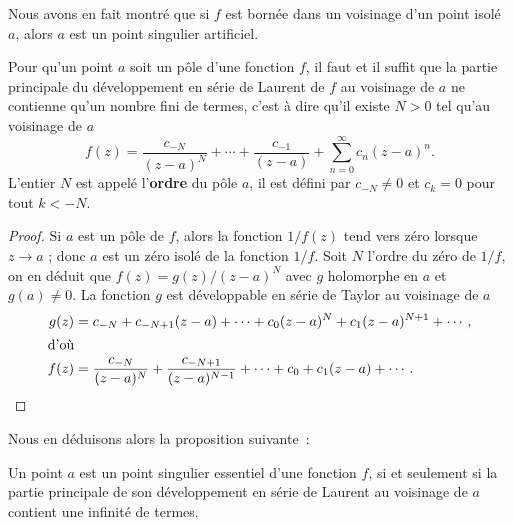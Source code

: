 \begin{rem} Nous avons en fait montré que si $f$ est bornée dans un voisinage d'un point isolé $a$, alors $a$ est un point singulier artificiel. 
\end{rem}

\begin{fprop} Pour qu'un point $a$ soit un pôle d'une fonction $f$, il faut et il suffit que la partie principale du développement en série de Laurent de $f$ au voisinage de $a$ ne contienne qu'un nombre fini de termes, c'est à dire qu'il existe $N>0$ tel qu'au voisinage de $a$
\[ f(z)=\frac{c_{-N}}{(z-a)^N} + \cdots + \frac{c_{-1}}{(z-a)} + \sum_{n=0}^\infty c_n(z-a)^n.\]
L'entier $N$ est appelé l'\textbf{ordre} du pôle $a$, il est défini par $c_{-N} \neq 0$ et $c_{k} = 0$ pour tout $k <-N$.  
\end{fprop}

\begin{proof}
Si $a$ est un pôle de $f$, alors la fonction $1/f(z)$ tend vers zéro lorsque $z \to a$ ; donc $a$ est un zéro isolé de la fonction $1/f$. Soit $N$ l'ordre du zéro de $1/f$, on en déduit que $f(z)=g(z)/(z-a)^N$ avec $g$ holomorphe en $a$ et $g(a) \neq 0$. La fonction $g$ est développable en série de Taylor au voisinage de $a$
\begin{align*}
g(z)&=c_{-N} + c_{-N+1} (z-a)  + \cdots + c_0(z-a)^N + c_1(z-a)^{N+1} + \cdots,\\
\intertext{d'où}
f(z)&= \frac{c_{-N}}{(z-a)^N} + \frac{c_{-N+1}}{(z-a)^{N-1}} + \cdots + c_0 + c_1 (z-a) + \cdots.
\end{align*}
\end{proof}

Nous en déduisons alors la proposition suivante~:
\begin{prop}
Un point $a$ est un point singulier essentiel d'une fonction $f$, si et seulement si la partie principale de son développement en série de Laurent au voisinage de $a$ contient une infinité de termes.
\end{prop}

